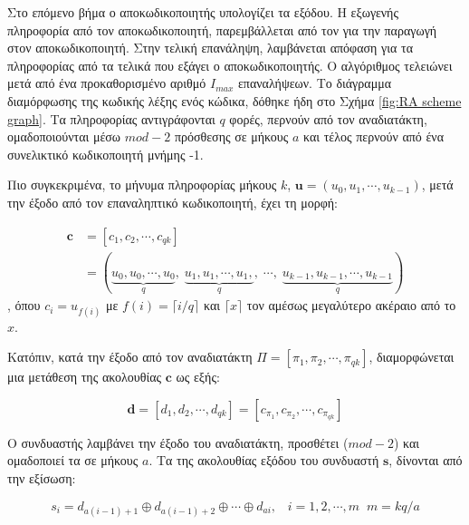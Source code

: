 Στο επόμενο βήμα ο  αποκωδικοποιητής υπολογίζει τα  εξόδου. Η εξωγενής πληροφορία από τον  αποκωδικοποιητή, παρεμβάλλεται από τον  για την παραγωγή  στον  αποκωδικοποιητή. Στην τελική επανάληψη, λαμβάνεται απόφαση για τα  πληροφορίας από τα τελικά  που εξάγει ο  αποκωδικοποιητής. Ο αλγόριθμος τελειώνει μετά από ένα προκαθορισμένο αριθμό $I_{max}$ επαναλήψεων. Το  διάγραμμα διαμόρφωσης της κωδικής λέξης ενός  κώδικα, δόθηκε ήδη στο Σχήμα \ref{fig:RA scheme graph}. Τα  πληροφορίας αντιγράφονται $q$ φορές, περνούν από τον αναδιατάκτη, ομαδοποιούνται μέσω $mod-2$ πρόσθεσης σε  μήκους $a$ και τέλος περνούν από ένα συνελικτικό κωδικοποιητή μνήμης -1.

Πιο συγκεκριμένα, το μήνυμα πληροφορίας μήκους $k$, $\mathbf{u}=\left(u_0,u_1,\cdots,u_{k-1}\right)$, μετά την έξοδο από τον επαναληπτικό κωδικοποιητή, έχει τη μορφή:

\begin{equation}
\begin{split}
\mathbf{c} &= \left[c_1, c_2, \cdots, c_{qk} \right] \\
&= (\underbrace{u_0,u_0,\cdots,u_0}_q, \; \underbrace{u_1,u_1,\cdots,u_1,}_q, \; \cdots, \; \underbrace{u_{k-1},u_{k-1},\cdots,u_{k-1}}_q)
\end{split}
\end{equation}
, όπου $c_i=u_{f(i)}$ με $f(i)=\lceil i/q \rceil$ και $\lceil x \rceil$ τον αμέσως μεγαλύτερο ακέραιο από το $x$.

Κατόπιν, κατά την έξοδο από τον αναδιατάκτη $\Pi=[\pi_1,\pi_2,\cdots,\pi_{qk}]$, διαμορφώνεται μια μετάθεση της ακολουθίας $\mathbf{c}$ ως εξής:

\begin{equation*}
\mathbf{d} = \left[d_1, d_2, \cdots, d_{qk} \right] = [c_{\pi_1}, c_{\pi_2}, \cdots, c_{\pi_{qk}}]
\end{equation*}

Ο συνδυαστής λαμβάνει την έξοδο του αναδιατάκτη, προσθέτει ($mod-2$) και ομαδοποιεί τα  σε  μήκους $a$. Τα  της ακολουθίας εξόδου του συνδυαστή $\mathbf{s}$, δίνονται από την εξίσωση:

\begin{equation}
s_i=d_{a(i-1)+1}\oplus d_{a(i-1)+2} \oplus \cdots \oplus d_{ai}, \;\;\; i=1,2,\cdots,m\;\;m=kq/a
\label{eq:combiner equation}
\end{equation}

